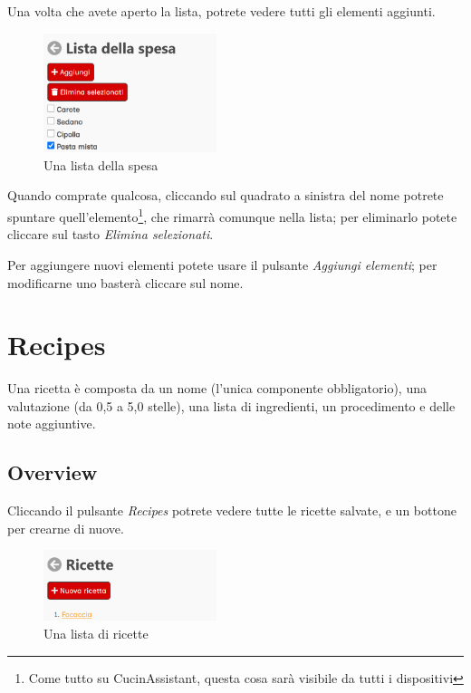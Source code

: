 \documentclass[12pt, a4paper]{report}
\begin{document}
    Una volta che avete aperto la lista, potrete vedere tutti gli elementi aggiunti.

    \begin{figure}[H]
        \centering
        \includegraphics[width=0.45\textwidth]{assets/it/shopping_list.png}
        \caption{Una lista della spesa}
    \end{figure}

    Quando comprate qualcosa, cliccando sul quadrato a sinistra del nome potrete spuntare quell'elemento\footnote{Come tutto su CucinAssistant,
    questa cosa sarà visibile da tutti i dispositivi}, che rimarrà comunque nella lista; per eliminarlo potete cliccare sul tasto \emph{Elimina
    selezionati}.

    Per aggiungere nuovi elementi potete usare il pulsante \emph{Aggiungi elementi}; per modificarne uno basterà cliccare sul nome.



    \chapter{Recipes} \label{recipes}

    Una ricetta è composta da un nome (l'unica componente obbligatorio), una valutazione (da 0,5 a 5,0 stelle), una lista di ingredienti, un
    procedimento e delle note aggiuntive.

    \section{Overview}

    Cliccando il pulsante \emph{Recipes} potrete vedere tutte le ricette salvate, e un bottone per crearne di nuove.

    \begin{figure}[H]
        \centering
        \includegraphics[width=0.45\textwidth]{assets/it/recipes.png}
        \caption{Una lista di ricette}
    \end{figure}
\end{document}
